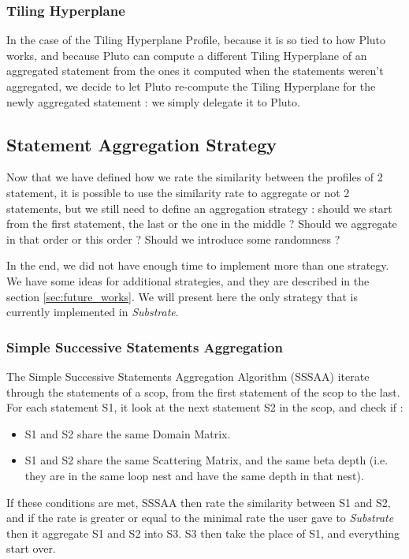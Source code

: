 \documentclass[paper=a4, fontsize=11pt]{scrartcl}
\numberwithin{equation}{section}        %
\numberwithin{figure}{section}          %
\numberwithin{table}{section}               %
\begin{document}
        \subsubsection{Tiling Hyperplane}
            In the case of the Tiling Hyperplane Profile, because it is so tied to how
            Pluto works, and because Pluto can compute a different Tiling Hyperplane
            of an aggregated statement from the ones it computed when the statements weren't
            aggregated, we decide to let Pluto re-compute the Tiling Hyperplane for the newly
            aggregated statement : we simply delegate it to Pluto.

    \subsection{Statement Aggregation Strategy}
        Now that we have defined how we rate the similarity between the profiles of 2 statement,
        it is possible to use the similarity rate to aggregate or not 2 statements, but
        we still need to define an aggregation strategy : should we start from the first
        statement, the last or the one in the middle ? Should we aggregate in that order
        or this order ? Should we introduce some randomness ?

        In the end, we did not have enough time to implement more than one strategy. We
        have some ideas for additional strategies, and they are described in the section
        \ref{sec:future_works}. We will present here the only strategy that is currently implemented
        in \textit{Substrate}.
        \subsubsection{Simple Successive Statements Aggregation}
            The Simple Successive Statements Aggregation Algorithm (SSSAA) iterate through
            the statements of a scop, from the first statement of the scop to the last.
            For each statement S1, it look at the next statement S2 in the scop, and
            check if :
            \begin{itemize}
                \item S1 and S2 share the same Domain Matrix.
                \item S1 and S2 share the same Scattering Matrix, and the same beta depth
                    (i.e. they are in the same loop nest and have the same depth in that nest).
            \end{itemize}
            If these conditions are met, SSSAA then rate the similarity between S1 and S2,
            and if the rate is greater or equal to the minimal rate the user gave to \textit{Substrate}
            then it aggregate S1 and S2 into S3. S3 then take the place of S1, and everything start
            over.
\end{document}
